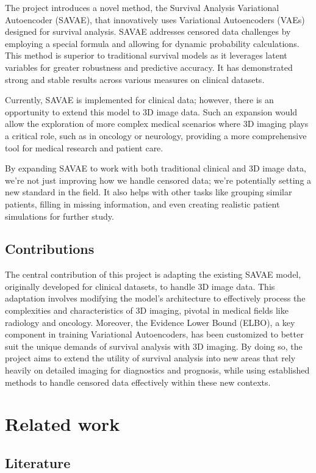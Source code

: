 \documentclass{article}
\begin{document}
The project introduces a novel method, the Survival Analysis Variational Autoencoder (SAVAE), that innovatively uses Variational Autoencoders (VAEs) designed for survival analysis. SAVAE addresses censored data challenges by employing a special formula and allowing for dynamic probability calculations. This method is superior to traditional survival models as it leverages latent variables for greater robustness and predictive accuracy. It has demonstrated strong and stable results across various measures on clinical datasets.

Currently, SAVAE is implemented for clinical data; however, there is an opportunity to extend this model to 3D image data. Such an expansion would allow the exploration of more complex medical scenarios where 3D imaging plays a critical role, such as in oncology or neurology, providing a more comprehensive tool for medical research and patient care.

By expanding SAVAE to work with both traditional clinical and 3D image data, we're not just improving how we handle censored data; we're potentially setting a new standard in the field. It also helps with other tasks like grouping similar patients, filling in missing information, and even creating realistic patient simulations for further study.


\subsection{Contributions}
The central contribution of this project is adapting the existing SAVAE model, originally developed for clinical datasets, to handle 3D image data. This adaptation involves modifying the model’s architecture to effectively process the complexities and characteristics of 3D imaging, pivotal in medical fields like radiology and oncology. Moreover, the Evidence Lower Bound (ELBO), a key component in training Variational Autoencoders, has been customized to better suit the unique demands of survival analysis with 3D imaging. By doing so, the project aims to extend the utility of survival analysis into new areas that rely heavily on detailed imaging for diagnostics and prognosis, while using established methods to handle censored data effectively within these new contexts.

\section{Related work}
\subsection{Literature}
\end{document}

